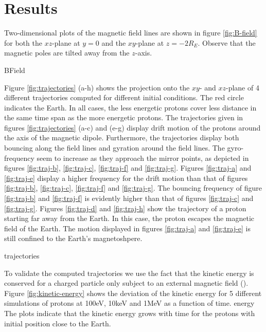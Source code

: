 \section{Results}
Two-dimensional plots of the magnetic field lines are shown in figure \ref{fig:B-field} for both the $xz$-plane at $y=0$ and the $xy$-plane at $z = -2R_E$. 
Observe that the magnetic poles are tilted away from the $z$-axis.

{BField}


Figure \ref{fig:trajectories} (a-h) shows the projection onto the $xy$- and $xz$-plane of 4 different trajectories computed for different initial conditions. 
The red circle indicates the Earth.
In all cases, the less energetic protons cover less distance in the same time span as the more energetic protons. 
The trajectories given in figures \ref{fig:trajectories} (a-c) and (e-g) display drift motion of the protons around the axis of the magnetic dipole.
Furthermore, the trajectories display both bouncing along the field lines and gyration around the field lines.
The gyro-frequency seem to increase as they approach the mirror points, as depicted in figures \ref{fig:traj-b}, \ref{fig:traj-c}, \ref{fig:traj-f} and \ref{fig:traj-g}.
Figures \ref{fig:traj-a} and \ref{fig:traj-e} display a higher frequency for the drift motion than that of figures \ref{fig:traj-b}, \ref{fig:traj-c}, \ref{fig:traj-f} and \ref{fig:traj-g}.
The bouncing frequency of figure \ref{fig:traj-b} and \ref{fig:traj-f} is evidently higher than that of figures \ref{fig:traj-c} and \ref{fig:traj-g}.
Figures \ref{fig:traj-d} and \ref{fig:traj-h} show the trajectory of a proton starting far away from the Earth.
In this case, the proton escapes the magnetic field of the Earth.
The motion displayed in figures \ref{fig:traj-a} and \ref{fig:traj-e} is still confined to the Earth's magnetoshpere.

{trajectories}

To validate the computed trajectories we use the fact that the kinetic energy is conserved for a charged particle only subject to an external magnetic field (\cite{griffiths_2024}). 
Figure \ref{fig:kinetic-energy} shows the deviation of the kinetic energy for 5 different simulations of protons at 100eV, 10keV and 1MeV as a function of time. 
{energy} %
The plots indicate that the kinetic energy grows with time for the protons with initial position close to the Earth. 
